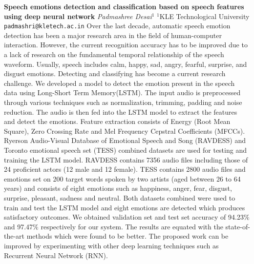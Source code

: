 
    \begin{conf-abstract}[]
        {\textbf{Speech emotions detection and classification based on speech features using  deep neural network }}
        {\textit{Padmashree Desai$^{1}$}}
        {$^{1}$KLE Technological University}
        {\texttt{padmashri@kletech.ac.in}}
        {Over the last decade, automatic speech emotion detection has been a major research area in the field of human-computer interaction. However, the current recognition accuracy has to be improved due to a lack of research on the fundamental temporal relationship of the speech waveform. Usually, speech includes calm, happy, sad, angry, fearful, surprise, and disgust emotions. Detecting and classifying has become a current research challenge. We developed a model to detect the emotion present in the speech data using Long-Short Term Memory(LSTM). The input audio is preprocessed through various techniques such as normalization, trimming, padding and noise reduction. The audio is then fed into the LSTM model to extract the features and detect the emotions. Feature extraction consists of Energy (Root Mean Square), Zero Crossing Rate and Mel Frequency Cepstral Coefficients (MFCCs). Ryerson Audio-Visual Database of Emotional Speech and Song (RAVDESS) and Toronto emotional speech set (TESS) combined datasets are used for testing and training the LSTM model. RAVDESS contains 7356 audio files including those of 24 proficient actors (12 male and 12 female). TESS contains 2800 audio files and emotions set on 200 target words spoken by two artists (aged between 26 to 64 years) and consists of eight emotions such as happiness, anger, fear, disgust, surprise, pleasant, sadness and neutral. Both datasets combined were used to train and test the LSTM model and eight emotions are detected which produces satisfactory outcomes. We obtained validation set and test set accuracy of 94.23\% and 97.47\% respectively for our system. The results are equated with the state-of-the-art methods which were found to be better. The proposed work can be improved by experimenting with  other deep learning techniques such as Recurrent Neural Network (RNN). }
    \end{conf-abstract}
        